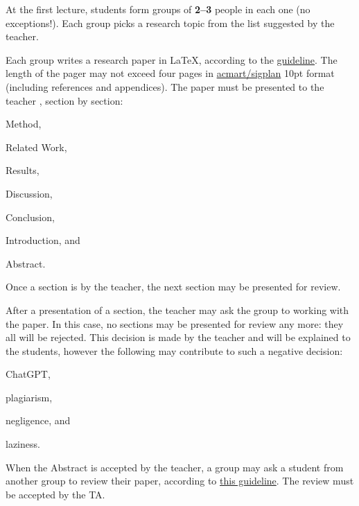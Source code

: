 \documentclass[nobrand,anonymous,nodate,nosecurity]{huawei}
\begin{document}
{At the first lecture, students form groups of \textbf{2--3} people in each one (no exceptions!).
Each group picks a research topic from the list suggested by the teacher.

Each group writes a research paper in \LaTeX, according
to the \href{https://www.yegor256.com/2022/08/24/research-paper-template.html}{guideline}.
The length of the pager may not exceed four pages in
\href{https://ctan.org/pkg/acmart}{acmart/sigplan} 10pt format
(including references and appendices).
The paper must be presented to the teacher , section by section:
\begin{inparaenum}[1)]
\item Method,
\item Related Work,
\item Results,
\item Discussion,
\item Conclusion,
\item Introduction,
and
\item Abstract.
\end{inparaenum}
Once a section is  by the teacher, the next section may be presented for review.

After a presentation of a section, the teacher may ask the group to 
working with the paper. In this case, no sections may be presented for review any more: they all will be rejected.
This decision is  made by the teacher and will  be explained
to the students, however the following may contribute to such a
negative decision:
\begin{inparaenum}[a)]
    \item ChatGPT,
    \item plagiarism,
    \item negligence,
    and
    \item laziness.
\end{inparaenum}

When the Abstract is accepted by the teacher, a group may ask a student from another
group to review their paper, according to
\href{https://www.yegor256.com/2023/12/17/how-to-review-research-paper.html}{this guideline}.
The review must be accepted by the TA.

}
\end{document}
